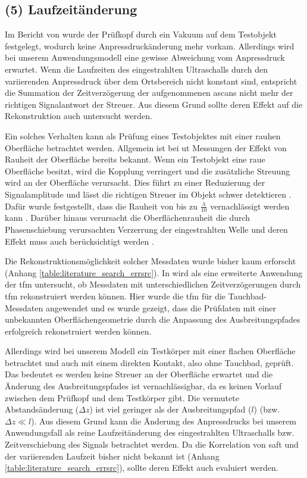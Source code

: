 \subsection*{(5) Laufzeitänderung}
Im Bericht von \cite{Mayer16SAFTwithSmallData} wurde der Prüfkopf durch ein Vakuum auf dem Testobjekt festgelegt, wodurch keine Anpressdruckänderung mehr vorkam. Allerdings wird bei unserem Anwendungsmodell eine gewisse Abweichung vom Anpressdruck erwartet. Wenn die Laufzeiten des eingestrahlten Ultraschalls durch den variierenden Anpressdruck über dem Ortsbereich nicht konstant sind, entspricht die Summation der Zeitverzögerung der aufgenommenen \glspl{ascan} nicht mehr der richtigen Signalantwort der Streuer. Aus diesem Grund sollte deren Effekt auf die Rekonstruktion auch untersucht werden. \par
Ein solches Verhalten kann als Prüfung eines Testobjektes mit einer rauhen Oberfläche betrachtet werden. Allgemein ist bei \acrshort{ut} Messungen der Effekt von Rauheit der Oberfläche bereits bekannt. Wenn ein Testobjekt eine raue Oberfläche besitzt, wird die Kopplung verringert und die zusätzliche Streuung wird an der Oberfläche verursacht. Dies führt zu einer Reduzierung der Signalamplitude und lässt die richtigen Streuer im Objekt schwer detektieren \cite{Wang18UTwithRoughSurface}. Dafür wurde festgestellt, dass die Rauheit von bis zu $\frac{\lambda}{10}$ vernachlässigt werden kann \cite{Ginzel99UTroughsurface}. Darüber hinaus verursacht die Oberflächenrauheit die durch Phasenschiebung verursachten Verzerrung der eingestrahlten Welle und deren Effekt muss auch berücksichtigt werden \cite{Wang18UTwithRoughSurface} \cite{Benstock14UTwithRoughSurface}. \par
Die Rekonstruktionsmöglichkeit solcher Messdaten wurde bisher kaum erforscht (Anhang \ref{table:literature_search_errsrc}). In \cite{Sutcliffe13TFMwithNonPlanarSurface} wird als eine erweiterte Anwendung der \gls{tfm} untersucht, ob Messdaten mit unterschiedlichen Zeitverzögerungen durch \gls{tfm} rekonstruiert werden können. Hier wurde die \gls{tfm} für die Tauchbad-Messdaten angewendet und es wurde gezeigt, dass die Prüfdaten mit einer unbekannten Oberflächengeometrie durch die Anpassung des Ausbreitungspfades erfolgreich rekonstruiert werden können. \par
Allerdings wird bei unserem Modell ein Testkörper mit einer flachen Oberfläche betrachtet und auch mit einem direkten Kontakt, also ohne Tauchbad, geprüft. Das bedeutet es werden keine Streuer an der Oberfläche erwartet und die Änderung des Ausbreitungspfades ist vernachlässigbar, da es keinen Vorlauf zwischen dem Prüfkopf und dem Testkörper gibt. Die vermutete Abstandsänderung ($\Delta z$) ist viel geringer als der Ausbreitungspfad ($l$) (bzw. $\Delta z \ll l$). Aus diesem Grund kann die Änderung des Anpressdrucks bei unserem Anwendungsfall als reine Laufzeitänderung des eingestrahlten Ultraschalls bzw. Zeitverschiebung des Signals betrachtet werden. Da die Korrelation von \acrshort{saft} und der variierenden Laufzeit bisher nicht bekannt ist (Anhang \ref{table:literature_search_errsrc}), sollte deren Effekt auch evaluiert werden.



